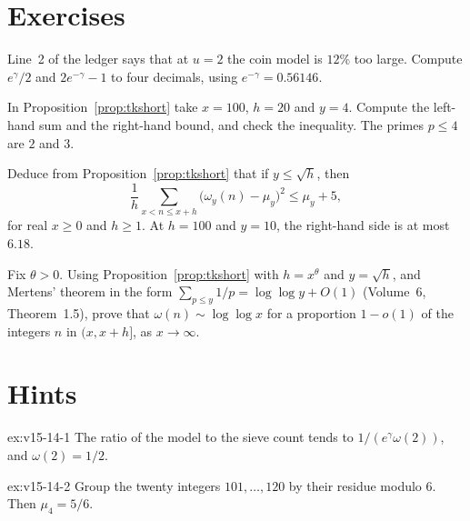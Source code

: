 \section{Exercises}

\begin{exercise}[$\star$]\label{ex:v15-14-1}
Line~2 of the ledger says that at \(u=2\) the coin model is \(12\%\) too large. Compute \(e^{\gamma}/2\) and \(2e^{-\gamma}-1\) to four decimals, using \(e^{-\gamma}=0.56146\).
\end{exercise}

\begin{exercise}[$\star$]\label{ex:v15-14-2}
In Proposition~\ref{prop:tkshort} take \(x=100\), \(h=20\) and \(y=4\). Compute the left-hand sum and the right-hand bound, and check the inequality. The primes \(p\le4\) are \(2\) and \(3\).
\end{exercise}

\begin{exercise}[$\star\star$]\label{ex:v15-14-3}
Deduce from Proposition~\ref{prop:tkshort} that if \(y\le\sqrt h\), then
\[
\frac1h\sum_{x<n\le x+h}\bigl(\omega_y(n)-\mu_y\bigr)^2\le\mu_y+5,
\]
for real \(x\ge0\) and \(h\ge1\). At \(h=100\) and \(y=10\), the right-hand side is at most \(6.18\).
\end{exercise}

\begin{exercise}[$\star\star\star$]\label{ex:v15-14-4}
Fix \(\theta>0\). Using Proposition~\ref{prop:tkshort} with \(h=x^{\theta}\) and \(y=\sqrt h\), and Mertens' theorem in the form \(\sum_{p\le y}1/p=\log\log y+O(1)\) (Volume~6, Theorem~1.5), prove that \(\omega(n)\sim\log\log x\) for a proportion \(1-o(1)\) of the integers \(n\) in \((x,x+h]\), as \(x\to\infty\).
\end{exercise}

\section{Hints}

\begin{hint}{ex:v15-14-1}
The ratio of the model to the sieve count tends to \(1/(e^{\gamma}\omega(2))\), and \(\omega(2)=1/2\).
\end{hint}

\begin{hint}{ex:v15-14-2}
Group the twenty integers \(101,\dots,120\) by their residue modulo \(6\). Then \(\mu_4=5/6\).
\end{hint}


